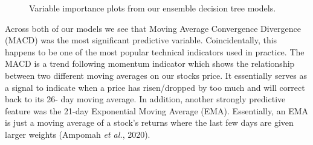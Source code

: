 \begin{figure}[h]
        \begin{adjustwidth}{-1.2cm}{}

    \caption{\small{Variable importance plots from our ensemble decision tree models. }}
\label{}
 \end{adjustwidth}    

\end{figure}



Across both of our models we see that Moving Average Convergence Divergence (MACD) was the most significant predictive variable. Coincidentally, this happens to be one of the most popular technical indicators used in practice. The MACD is a trend following momentum indicator which shows the relationship between two different moving averages on our stocks price. It essentially serves as a signal to indicate when a price has risen/dropped by too much and will correct back to its 26- day moving average. In addition, another strongly predictive feature was the 21-day Exponential Moving Average (EMA). Essentially, an EMA is just a moving average of a stock’s returns where the last few days are given larger weights (Ampomah \textit{et al.}, 2020).



